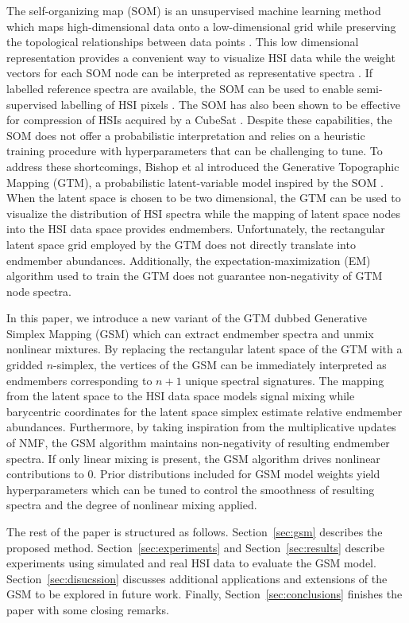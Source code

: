 \documentclass[remotesensing,article,submit,pdftex,moreauthors]{Definitions/mdpi}
\begin{document}
The self-organizing map (SOM) is an unsupervised machine learning method which maps high-dimensional data onto a low-dimensional grid while preserving the topological relationships between data points \cite{kohonen-som-1}. This low dimensional representation provides a convenient way to visualize HSI data while the weight vectors for each SOM node can be interpreted as representative spectra \cite{cantero2004analysis, duran2007time,som-hsi}. If labelled reference spectra are available, the SOM can be used to enable semi-supervised labelling of HSI pixels \cite{riese2019supervised}. The SOM has also been shown to be effective for compression of HSIs acquired by a CubeSat \cite{som-satellite}. Despite these capabilities, the SOM does not offer a probabilistic interpretation and relies on a heuristic training procedure with hyperparameters that can be challenging to tune. To address these shortcomings, Bishop et al introduced the Generative Topographic Mapping (GTM), a probabilistic latent-variable model inspired by the SOM \cite{gtm-orig}. When the latent space is chosen to be two dimensional, the GTM can be used to visualize the distribution of HSI spectra while the mapping of latent space nodes into the HSI data space provides endmembers\cite{robot-team-gtm}. Unfortunately, the rectangular latent space grid employed by the GTM does not directly translate into endmember abundances. Additionally, the expectation-maximization (EM) algorithm used to train the GTM does not guarantee non-negativity of GTM node spectra. 

In this paper, we introduce a new variant of the GTM dubbed Generative Simplex Mapping (GSM) which can extract endmember spectra and unmix nonlinear mixtures. By replacing the rectangular latent space of the GTM with a gridded $n$-simplex, the vertices of the GSM can be immediately interpreted as endmembers corresponding to $n+1$ unique spectral signatures. The mapping from the latent space to the HSI data space models signal mixing while barycentric coordinates for the latent space simplex estimate relative endmember abundances. Furthermore, by taking inspiration from the multiplicative updates of NMF, the GSM algorithm maintains non-negativity of resulting endmember spectra. If only linear mixing is present, the GSM algorithm drives nonlinear contributions to $0$. Prior distributions included for GSM model weights yield hyperparameters which can be tuned to control the smoothness of resulting spectra and the degree of nonlinear mixing applied.

The rest of the paper is structured as follows. Section~\ref{sec:gsm} describes the proposed method. Section~\ref{sec:experiments} and Section~\ref{sec:results} describe experiments using simulated and real HSI data to evaluate the GSM model. Section~\ref{sec:disucssion} discusses additional applications and extensions of the GSM to be explored in future work. Finally, Section~\ref{sec:conclusions} finishes the paper with some closing remarks.
\end{document}
